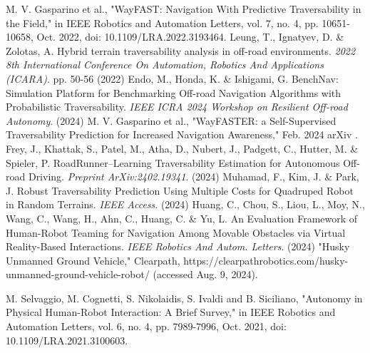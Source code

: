\documentclass[letterpaper, 10 pt, conference]{ieeeconf}  %
\begin{document}




\begin{thebibliography}{99}

 M. V. Gasparino et al., "WayFAST: Navigation With Predictive Traversability in the Field," in IEEE Robotics and Automation Letters, vol. 7, no. 4, pp. 10651-10658, Oct. 2022, doi: 10.1109/LRA.2022.3193464.
Leung, T., Ignatyev, D. \& Zolotas, A. Hybrid terrain traversability analysis in off-road environments. {\em 2022 8th International Conference On Automation, Robotics And Applications (ICARA)}. pp. 50-56 (2022)
Endo, M., Honda, K. \& Ishigami, G. BenchNav: Simulation Platform for Benchmarking Off-road Navigation Algorithms with Probabilistic Traversability. {\em IEEE ICRA 2024 Workshop on Resilient Off-road Autonomy}. (2024)
 M. V. Gasparino et al., "WayFASTER: a Self-Supervised Traversability Prediction for Increased Navigation Awareness," Feb. 2024 arXiv .
Frey, J., Khattak, S., Patel, M., Atha, D., Nubert, J., Padgett, C., Hutter, M. \& Spieler, P. RoadRunner–Learning Traversability Estimation for Autonomous Off-road Driving. {\em Preprint ArXiv:2402.19341}. (2024)
Muhamad, F., Kim, J. \& Park, J. Robust Traversability Prediction Using Multiple Costs for Quadruped Robot in Random Terrains. {\em IEEE Access}. (2024)
Huang, C., Chou, S., Liou, L., Moy, N., Wang, C., Wang, H., Ahn, C., Huang, C. \& Yu, L. An Evaluation Framework of Human-Robot Teaming for Navigation Among Movable Obstacles via Virtual Reality-Based Interactions. {\em IEEE Robotics And Autom. Letters}. (2024)
"Husky Unmanned Ground Vehicle," Clearpath, https://clearpathrobotics.com/husky-unmanned-ground-vehicle-robot/ (accessed Aug. 9, 2024).

 M. Selvaggio, M. Cognetti, S. Nikolaidis, S. Ivaldi and B. Siciliano, "Autonomy in Physical Human-Robot Interaction: A Brief Survey," in IEEE Robotics and Automation Letters, vol. 6, no. 4, pp. 7989-7996, Oct. 2021, doi: 10.1109/LRA.2021.3100603.




\end{thebibliography}
\end{document}
